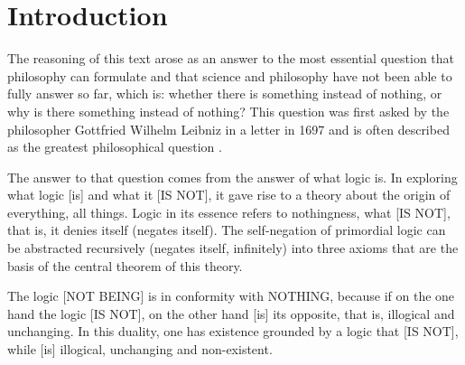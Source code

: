 \section*{Introduction}

The reasoning of this text arose as an answer to the most essential question that philosophy can formulate and that science and philosophy have not been able to fully answer so far, which is: whether there is something instead of nothing, or why is there something instead of nothing? 
This question was first asked by the philosopher Gottfried Wilhelm Leibniz in a letter in 1697 and is often described as the greatest philosophical question \cite{leibniz_origin_of_things}.

The answer to that question comes from the answer of what logic is. In exploring what logic [is] and what it [IS NOT], it gave rise to a theory about the origin of everything, all things. Logic in its essence refers to nothingness, what [IS NOT], that is, it denies itself (negates itself). The self-negation of primordial logic can be abstracted recursively (negates itself, infinitely) into three axioms that are the basis of the central theorem of this theory.

The logic [NOT BEING] is in conformity with NOTHING, because if on the one hand the logic [IS NOT], on the other hand [is] its opposite, that is, illogical and unchanging. In this duality, one has existence grounded by a logic that [IS NOT], while [is] illogical, unchanging and non-existent. 

